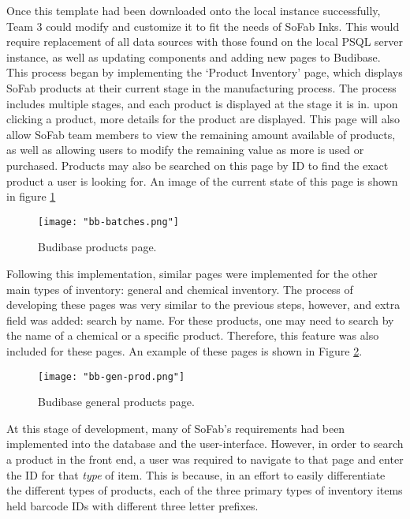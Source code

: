 \documentclass{article}
\begin{document}
Once this template had been downloaded onto the local instance successfully, Team 3 could modify and customize it to fit the needs of
SoFab Inks. This would require replacement of all data sources with those found on the local PSQL server instance, as well as updating
components and adding new pages to Budibase. This process began by implementing the `Product Inventory' page, which displays
SoFab products at their current stage in the manufacturing process. The process includes multiple stages, and each product is 
displayed at the stage it is in. upon clicking a product, more details for the product are displayed. This page will also allow SoFab 
team members to view the remaining amount available of products, as well as allowing users to modify the remaining value as more is 
used or purchased. Products may also be searched on this page by ID to find the exact product a user is looking for.
An image of the current state of this page is shown in figure \ref{fig:bb_batches}
\begin{figure}[h]
\centering
    \centering
    \texttt{[image: "bb-batches.png"]}
    \caption{Budibase products page.}
    \label{fig:bb_batches}
\end{figure}
\FloatBarrier

Following this implementation, similar pages were implemented for the other main types of inventory: general and chemical inventory. 
The process of developing these pages was very similar to the previous steps, however, and extra field was added: search by name. For 
these products, one may need to search by the name of a chemical or a specific product. Therefore, this feature was also included for these
pages. An example of these pages is shown in Figure \ref{fig:bb_gen_prod}.

\begin{figure}[h]
\centering
    \centering
    \texttt{[image: "bb-gen-prod.png"]}
    \caption{Budibase general products page.}
    \label{fig:bb_gen_prod}
\end{figure}
\FloatBarrier

At this stage of development, many of SoFab's requirements had been implemented into the database and the user-interface. However, in 
order to search a product in the front end, a user was required to navigate to that page and enter the ID for that \textit{type} of 
item. This is because, in an effort to easily differentiate the different types of products, each of the three primary types of 
inventory items held barcode IDs with different three letter prefixes. 
\end{document}
